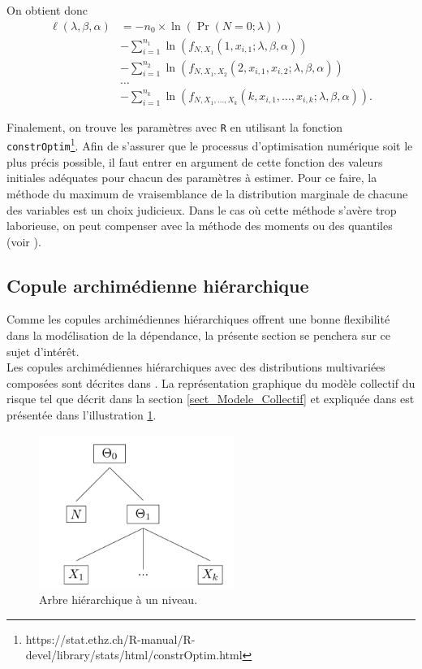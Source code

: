 \documentclass{article}
\begin{document}
		On obtient donc
		\begin{align}
		\ell(\lambda, \beta, \alpha) 
		&=  - n_0 \times \ln \left( \Pr (N=0 ; \lambda) \right) \nonumber\\
		& - \sum_{i=1}^{n_1} \ln \left(f_{N,X_1}(1,x_{i,1};\lambda,\beta, \alpha) \right) \nonumber \\
		& - \sum_{i=1}^{n_2} \ln \left(f_{N,X_1,X_2}(2,x_{i,1},x_{i,2};\lambda,\beta, \alpha)\right) \label{logLikelyhood_neg} \\
		& \dots \nonumber\\
		& - \sum_{i=1}^{n_k} \ln \left( f_{N,X_1,\dots,X_k}(k,x_{i,1},\dots,x_{i,k};\lambda,\beta, \alpha)\right). \nonumber
		\end{align}
		
		Finalement, on trouve les paramètres avec \texttt{R} en utilisant la fonction \texttt{constrOptim}\footnote{https://stat.ethz.ch/R-manual/R-devel/library/stats/html/constrOptim.html}. Afin de s'assurer que le processus d'optimisation numérique soit le plus précis possible, il faut entrer en argument de cette fonction des valeurs initiales adéquates pour chacun des paramètres à estimer. Pour ce faire, la méthode du maximum de vraisemblance de la distribution marginale de chacune des variables est un choix judicieux. Dans le cas où cette méthode s'avère trop laborieuse, on peut compenser avec la méthode des moments ou des quantiles (voir \cite{LossModels_Klugman2012}).
		

	\subsection{Copule archimédienne hiérarchique}	
	Comme les copules archimédiennes hiérarchiques offrent une bonne flexibilité dans la modélisation de la dépendance, la présente section se penchera sur ce sujet d'intérêt.\\
	
	Les copules archimédiennes hiérarchiques avec des distributions multivariées composées sont décrites dans \cite{Itre4}. La représentation graphique du modèle collectif du risque tel que décrit dans la section \ref{sect_Modele_Collectif} et expliquée dans \cite{Itre5} est présentée dans l'illustration \ref{graph_hierarchie}.
	
	\begin{figure}[H]
		\centering
		\includegraphics[height=5cm]{Hierarchie}
		\renewcommand{\figurename}{Illustration}
		\caption{Arbre hiérarchique à un niveau.} \label{graph_hierarchie}
	\end{figure}
\end{document}
